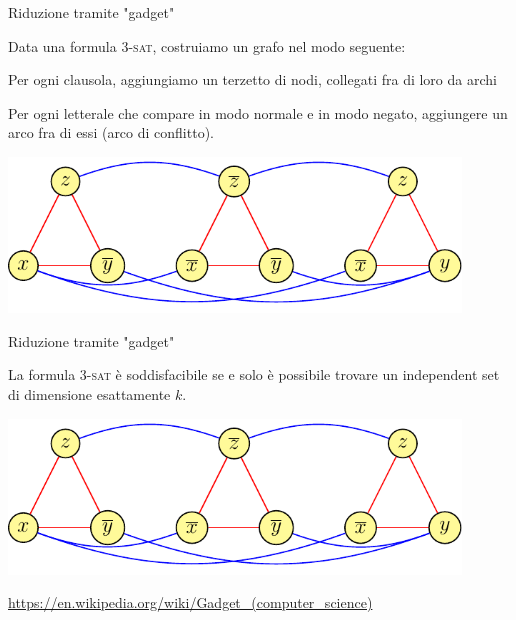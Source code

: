 \begin{frame}{Riduzione tramite "gadget"}

Data una formula \textsc{3-sat}, costruiamo un grafo nel modo seguente:
\BIL
\item Per ogni clausola, aggiungiamo un terzetto di nodi, collegati fra di loro
da archi
\item Per ogni letterale che compare in modo normale e in modo negato, aggiungere un arco fra di essi (arco di conflitto).
\EIL

\bigskip
\begin{center}
\includegraphics[width=0.9\textwidth,page=1]{gadget.pdf}
\end{center}

\end{frame}

\begin{frame}{Riduzione tramite "gadget"}

La formula \textsc{3-sat} è soddisfacibile se e solo è possibile trovare un
independent set di dimensione esattamente $k$.

\bigskip
\begin{center}
\includegraphics[width=0.9\textwidth,page=2]{gadget.pdf}
\end{center}

\small
\url{https://en.wikipedia.org/wiki/Gadget\_(computer\_science)}

\end{frame}

